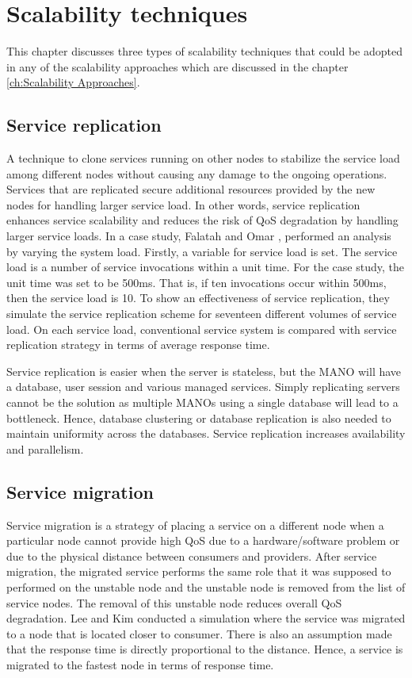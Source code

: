 \chapter{Scalability techniques}
\label{ch:Scalability Techniques}

This chapter discusses three types of scalability techniques that could be adopted in any of the scalability approaches which are discussed in the chapter \ref{ch:Scalability Approaches}.

\section{Service replication}

A technique to clone services running on other nodes to stabilize the service load among different nodes without causing any damage to the ongoing operations. Services that are replicated secure additional resources provided by the new nodes for handling larger service load. In other words, service replication enhances service scalability and reduces the risk of QoS degradation by handling larger service loads. In a case study, Falatah and Omar \cite{falatah_cloud_2014}, performed an analysis by varying the system load. Firstly, a variable for service load is set. The service load is a number of service invocations within a unit time. For the case study, the unit time was set to be 500ms. That is, if ten invocations occur within 500ms, then the service load is 10. To show an effectiveness of service replication, they simulate the service replication scheme for seventeen different volumes of service load. On each service load, conventional service system is compared with service replication strategy in terms of average response time.

Service replication is easier when the server is stateless, but the MANO will have a database, user session and various managed services. Simply replicating servers cannot be the solution as multiple MANOs using a single database will lead to a bottleneck. Hence, database clustering or database replication is also needed to maintain uniformity across the databases.  
Service replication increases availability and parallelism.


\section{Service migration}

Service migration is a strategy of placing a service on a different node when a particular node cannot provide high QoS due to a hardware/software problem or due to the physical distance between consumers and providers. After service migration, the migrated service performs the same role that it was supposed to performed on the unstable node and the unstable node is removed from the list of service nodes.
The removal of this unstable node reduces overall QoS degradation.
Lee and Kim \cite{lee_software_2010} conducted a simulation where the service was migrated to a node that is located closer to consumer. There is also an assumption made that the response time is directly proportional to the distance. Hence, a service is migrated to the fastest node in terms of response time.

